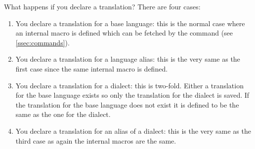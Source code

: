 \documentclass[DIV11,toc=index,toc=bib,numbers=noendperiod]{cnpkgdoc}
\begin{document}
What happens if you declare a translation? There are four cases:
\begin{enumerate}
  \item You declare a translation for a base language: this is the normal case
    where an internal macro is defined which can be fetched by the
     command (see \cref{ssec:commands}).
  \item You declare a translation for a language alias: this is the very same
    as the first case since the same internal macro is defined.
  \item You declare a translation for a dialect: this is two-fold.  Either a
    translation for the base language exists so only the translation for the
    dialect is saved.  If the translation for the base language does not exist
    it is defined to be the same as the one for the dialect.
  \item You declare a translation for an alias of a dialect: this is the very
    same as the third case as again the internal macros are the same.
\end{enumerate}
\end{document}
